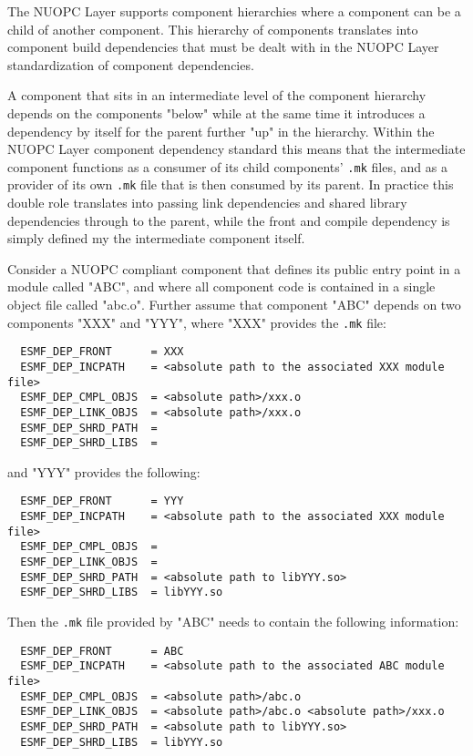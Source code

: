 The NUOPC Layer supports component hierarchies where a component can be a child of another component. This hierarchy of components translates into component build dependencies that must be dealt with in the NUOPC Layer standardization of component dependencies.

A component that sits in an intermediate level of the component hierarchy depends on the components "below" while at the same time it introduces a dependency by itself for the parent further "up" in the hierarchy. Within the NUOPC Layer component dependency standard this means that the intermediate component functions as a consumer of its child components' {\tt .mk} files, and as a provider of its own {\tt .mk} file that is then consumed by its parent. In practice this double role translates into passing link dependencies and shared library dependencies through to the parent, while the front and compile dependency is simply defined my the intermediate component itself.

Consider a NUOPC compliant component that defines its public entry point in a module called "ABC", and where all component code is contained in a single object file called "abc.o". Further assume that component "ABC" depends on two components "XXX" and "YYY", where "XXX" provides the {\tt .mk} file:
\begin{verbatim}
  ESMF_DEP_FRONT      = XXX
  ESMF_DEP_INCPATH    = <absolute path to the associated XXX module file>
  ESMF_DEP_CMPL_OBJS  = <absolute path>/xxx.o
  ESMF_DEP_LINK_OBJS  = <absolute path>/xxx.o
  ESMF_DEP_SHRD_PATH  = 
  ESMF_DEP_SHRD_LIBS  = 
\end{verbatim}
and "YYY" provides the following:
\begin{verbatim}
  ESMF_DEP_FRONT      = YYY
  ESMF_DEP_INCPATH    = <absolute path to the associated XXX module file>
  ESMF_DEP_CMPL_OBJS  = 
  ESMF_DEP_LINK_OBJS  = 
  ESMF_DEP_SHRD_PATH  = <absolute path to libYYY.so>
  ESMF_DEP_SHRD_LIBS  = libYYY.so
\end{verbatim}
Then the {\tt .mk} file provided by "ABC" needs to contain the following information:
\begin{verbatim}
  ESMF_DEP_FRONT      = ABC
  ESMF_DEP_INCPATH    = <absolute path to the associated ABC module file>
  ESMF_DEP_CMPL_OBJS  = <absolute path>/abc.o
  ESMF_DEP_LINK_OBJS  = <absolute path>/abc.o <absolute path>/xxx.o
  ESMF_DEP_SHRD_PATH  = <absolute path to libYYY.so>
  ESMF_DEP_SHRD_LIBS  = libYYY.so
\end{verbatim}

